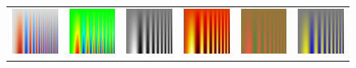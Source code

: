 \documentclass{acmsiggraph}               %
\begin{document}
\begin{figure}
  \centering
  \begin{tabular}{c@{\;}c@{\;}c@{\;}c@{\;}c@{\;}c}
    \includegraphics[width=1.1in]{images/Cool2WarmSpatialContrast} &
    \includegraphics[width=1.1in]{images/RainbowSpatialContrast} &
    \includegraphics[width=1.1in]{images/GrayscaleSpatialContrast} &
    \includegraphics[width=1.1in]{images/BlackBodySpatialContrast} &
    \includegraphics[width=1.1in]{images/Green2RedSpatialContrast} &
    \includegraphics[width=1.1in]{images/Blue2YellowSpatialContrast} \\


\end{tabular}
\end{figure}
\end{document}
